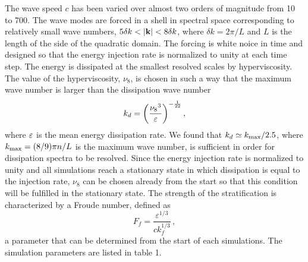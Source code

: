 %
The wave speed $c$ has been varied over almost two orders of magnitude from
10 to 700. The wave modes are forced in a shell in spectral space 
corresponding to relatively small wave numbers, 
$ 5 \delta k <  |\textbf{k}| <  8 \delta k$,  
where  $ \delta k = 2 \pi /L $ and $ L $ is the length of the side of the quadratic domain. 
The forcing is white noice in time and designed so that the energy injection rate is normalized to unity at each time step.
The energy is dissipated at the smallest resolved scales by hyperviscosity.
The value of the
hyperviscosity, $\nu_8$, is chosen in such a way that the  maximum wave number is larger than the dissipation wave number
\begin{equation} 
k_{d} = \left( \frac{{\nu_8}^3}{\varepsilon} \right)^{-\frac{1}{22}},
\end{equation}
 where $ \varepsilon $ is the mean energy dissipation rate. We found that  $
 k_{d} \simeq \kmax/ 2.5$, where $\kmax =
(8/9)\pi n/L $ is the maximum wave number, is  sufficient in order for dissipation spectra to be resolved. Since the energy injection rate is normalized to unity and all simulations reach a stationary state in which dissipation is equal to the injection rate, $ \nu_8 $ can be chosen already from the start so that this condition will be fulfilled in the stationary state.  The strength of the stratification is characterized by a Froude number, defined as
\begin{equation} \label{Fr}
F_f = \frac{\varepsilon^{1/3}}{c k_f^{1/3}} \, ,
\end{equation} 
a parameter that can be determined from the start of each simulations. 
The  simulation parameters are listed in table 1.  


